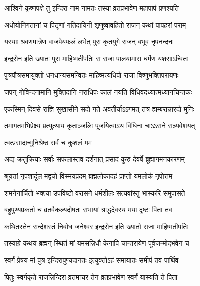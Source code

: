 \twolineshloka
{आश्विने कृष्णपक्षे तु इन्दिरा नाम नामतः}
{तस्या व्रतप्रभावेण महापापं प्रणश्यति}%

\twolineshloka
{अधोयोनिगतानां च पितॄणां गतिदायिनी}
{शृणुष्वावहितो राजन् कथां पापहरां पराम्}%

\twolineshloka
{यस्याः श्रवणमात्रेण वाजपेयफलं लभेत्}
{पुरा कृतयुगे राजन् बभूव नृपनन्दनः}%

\twolineshloka
{इन्द्रसेन इति ख्यातः पुरा माहिष्मतीपतिः}
{स राजा पालयामास धर्मेण यशसाऽन्वितः}%

\twolineshloka
{पुत्रपौत्रसमायुक्तो धनधान्यसमन्वितः}
{माहिष्मत्यधिपो राजा विष्णुभक्तिपरायणः}%

\twolineshloka
{जपन् गोविन्दनामानि मुक्तिदानि नराधिपः}
{कालं नयति विधिवदध्यात्मध्यानचिन्तकः}%

\twolineshloka
{एकस्मिन् दिवसे राज्ञि सुखासीने सदो गते}
{अवतीर्याऽऽगमत् तत्र ह्यम्बरान्नारदो मुनिः}%

\twolineshloka
{तमागतमभिप्रेक्ष्य प्रत्युत्थाय कृताञ्जलिः}
{पूजयित्वाऽथ विधिना चाऽऽसने सन्न्यवेशयत्}%


\onelineshloka
{त्वत्प्रसादान्मुनिश्रेष्ठ सर्वं च कुशलं मम}%

\twolineshloka
{अद्य क्रतुक्रियाः सर्वाः सफलास्तव दर्शनात्}
{प्रसादं कुरु देवर्षे ब्रूह्यागमनकारणम्}%


\twolineshloka
{श्रूयतां नृपशार्दूल मद्वचो विस्मयप्रदम्}
{ब्रह्मलोकादहं प्राप्तो यमलोकं नृपोत्तम}%

\twolineshloka
{शमनेनार्चितो भक्त्या उपविष्टो वरासने}
{धर्मशीलः सत्यवांस्तु भास्करिं समुपासते}%

\twolineshloka
{बहुपुण्यप्रकर्ता च व्रतवैकल्यदोषतः}
{सभायां श्राद्धदेवस्य मया दृष्टः पिता तव}%

\twolineshloka
{कथितस्तेन सन्देशस्तं निबोध जनेश्वर}
{इन्द्रसेन इति ख्यातो राजा माहिष्मतीपतिः}%

\twolineshloka
{तस्याग्रे कथय ब्रह्मन् स्थितं मां यमसन्निधौ}
{केनापि चान्तरायेण पूर्वजन्मोद्भवेन च}%

\twolineshloka
{स्वर्गं प्रेषय मां पुत्र इन्दिरापुण्यदानतः}
{इत्युक्तोऽहं समायातः समीपं तव पार्थिव}%

\twolineshloka
{पितुः स्वर्गकृते राजन्निन्दिरा व्रतमाचर}
{तेन व्रतप्रभावेण स्वर्गं यास्यति ते पिता}%


